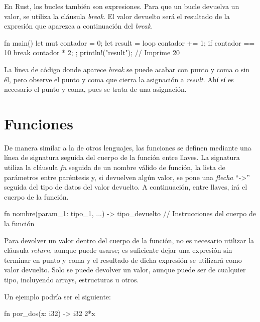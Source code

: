 En Rust, los bucles también son expresiones. Para que un bucle devuelva un valor, se utiliza la cláusula \textit{break}. El valor devuelto será el resultado de la expresión que aparezca a continuación del \textit{break}. 

\vspace{0.7em}
\begin{Codigo}
   fn main() {
      let mut contador = 0;
      let result = loop {
         contador += 1;
         if contador == 10 {
            break contador * 2;
         }
      };
      println!("{result}"); // Imprime 20
   }
\end{Codigo}

La línea de código donde aparece \textit{break} se puede acabar con punto y coma o sin él, pero observe el punto y coma que cierra la asignación a \textit{result}. Ahí sí es necesario el punto y coma, pues se trata de una asignación.


\section{Funciones}
\label{sec_funciones}
De manera similar a la de otros lenguajes, las funciones se definen mediante una línea de signatura seguida del cuerpo de la función entre llaves. La signatura utiliza la cláusula \textit{fn} seguida de un nombre válido de función, la lista de parámetros entre paréntesis y, si devuelven algún valor, se pone una \textit{flecha} ``->'' seguida del tipo de datos del valor devuelto. A continuación, entre llaves, irá el cuerpo de la función.

\vspace{0.7em}
\begin{Codigo}
fn nombre(param_1: tipo_1, ...) -> tipo_devuelto {
   // Instrucciones del cuerpo de la función
}
\end{Codigo}

Para devolver un valor dentro del cuerpo de la función, no es necesario utilizar la cláusula \textit{return}, aunque puede usarse; es suficiente dejar una expresión sin terminar en punto y coma y el resultado de dicha expresión se utilizará como valor devuelto. Solo se puede devolver un valor, aunque puede ser de cualquier tipo, incluyendo arrays, estructuras u otros.

\vspace{1em}

Un ejemplo podría ser el siguiente:

\vspace{0.7em}
\begin{Codigo}
fn por_dos(x: i32) -> i32 {
   2*x
}
\end{Codigo}

